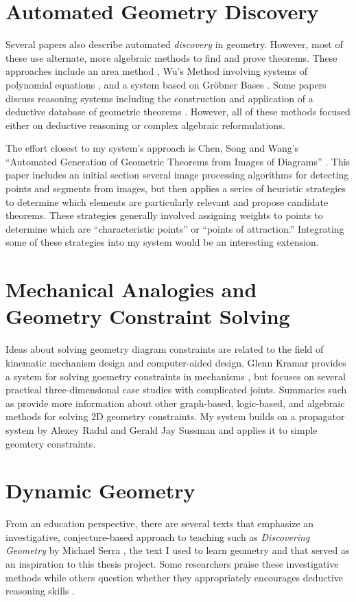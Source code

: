 \section{Automated Geometry Discovery}
Several papers also describe automated \emph{discovery} in
geometry. However, most of these use alternate, more algebraic methods
to find and prove theorems.  These approaches include an area method
\cite{autoTools}, Wu's Method involving systems of polynomial
equations \cite{wuMethod}, and a system based on Gr\"obner Bases
\cite{grobner}.  Some papers discuss reasoning systems including the
construction and application of a deductive database of geometric
theorems \cite{deductiveDatabase}.  However, all of these methods
focused either on deductive reasoning or complex algebraic
reformulations.

The effort closest to my system's approach is Chen, Song and Wang's
``Automated Generation of Geometric Theorems from Images of Diagrams''
\cite{fromImages}. This paper includes an initial section several
image processing algorithms for detecting points and segments from
images, but then applies a series of heuristic strategies to determine
which elements are particularly relevant and propose candidate
theorems. These strategies generally involved assigning weights to
points to determine which are ``characteristic points'' or ``points of
attraction.'' Integrating some of these strategies into my system would be
an interesting extension.

\section{Mechanical Analogies and Geometry Constraint Solving}

Ideas about solving geometry diagram constraints are related to the
field of kinematic mechanism design and computer-aided design. Glenn
Kramar provides a system for solving goemetry constraints in
mechanisms \cite{kramer1992solving}, but focuses on several practical
three-dimensional case studies with complicated joints. Summaries such
as \cite{joan2009basics} provide more information about other
graph-based, logic-based, and algebraic methods for solving 2D
geometry constraints. My system builds on a propagator system by
Alexey Radul and Gerald Jay Sussman \cite{radul-propagator} and
applies it to simple geomtery constraints.

\section{Dynamic Geometry}
From an education perspective, there are several texts that emphasize
an investigative, conjecture-based approach to teaching such as
\emph{Discovering Geometry} by Michael Serra \cite{serraDiscovering},
the text I used to learn geometry and that served as an inspiration to
this thesis project.  Some researchers praise these investigative
methods \cite{geoTransformations} while others question whether they
appropriately encourages deductive reasoning skills
\cite{geoTeaching}.



